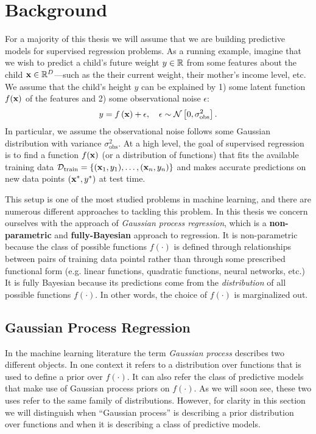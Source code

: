 \chapter{Background}

For a majority of this thesis we will assume that we are building predictive models for supervised regression problems.
As a running example, imagine that we wish to predict a child's future weight $y \in \mathbb{R}$ from some features about the child $\mathbf{x} \in \mathbb{R}^{D}$---such as the their current weight, their mother's income level, etc.
We assume that the child's height $y$ can be explained by 1) some latent function $f(\mathbf{x})$ of the features and 2) some observational noise $\epsilon$:
%
\begin{equation}
  y = f \left( \mathbf{x} \right) + \epsilon, \quad \epsilon \sim \mathcal{N} \left[ 0, \sigma_\text{obs}^2 \right].
  \label{eqn:regression}
\end{equation}
%
In particular, we assume the observational noise follows some Gaussian distribution with variance $\sigma_\text{obs}^2$.
At a high level, the goal of supervised regression is to find a function $f(\mathbf{x})$ (or a distribution of functions) that fits the available training data $\mathcal D_\text{train} = \{(\mathbf{x}_1, y_1), \ldots, (\mathbf{x}_n, y_n)\}$ and makes accurate predictions on new data points $( \mathbf{x}^*, y^* )$ at test time.

This setup is one of the most studied problems in machine learning, and there are numerous different approaches to tackling this problem.
In this thesis we concern ourselves with the approach of \emph{Gaussian process regression}, which is a {\bf non-parametric} and {\bf fully-Bayesian} approach to regression.
It is non-parametric because the class of possible functions $f(\cdot)$ is defined through relationships between pairs of training data pointsl
rather than through some prescribed functional form (e.g. linear functions, quadratic functions, neural networks, etc.)
It is fully Bayesian because its predictions come from the \emph{distribution} of all possible functions $f(\cdot)$.
In other words, the choice of $f(\cdot)$ is marginalized out.

\section{Gaussian Process Regression}

In the machine learning literature the term \emph{Gaussian process} describes two different objects.
In one context it refers to a distribution over functions that is used to define a prior over $f(\cdot)$.
It can also refer the class of predictive models that make use of Gaussian process priors on $f(\cdot)$.
As we will soon see, these two uses refer to the same family of distributions.
However, for clarity in this section we will distinguish when ``Gaussian process'' is describing a prior distribution over functions and when it is describing a class of predictive models.

